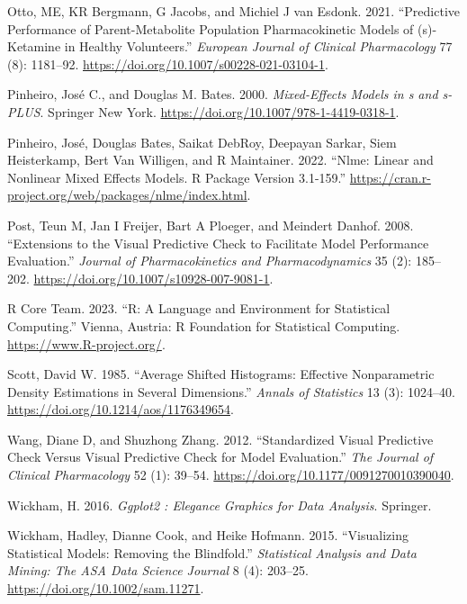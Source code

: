 \begin{CSLReferences}{1}{0}
\leavevmode{}%
Otto, ME, KR Bergmann, G Jacobs, and Michiel J van Esdonk. 2021. {``Predictive Performance of Parent-Metabolite Population Pharmacokinetic Models of (s)-Ketamine in Healthy Volunteers.''} \emph{European Journal of Clinical Pharmacology} 77 (8): 1181--92. \url{https://doi.org/10.1007/s00228-021-03104-1}.

\leavevmode{}%
Pinheiro, José C., and Douglas M. Bates. 2000. \emph{Mixed-Effects Models in s and s-{PLUS}}. Springer New York. \url{https://doi.org/10.1007/978-1-4419-0318-1}.

\leavevmode{}%
Pinheiro, José, Douglas Bates, Saikat DebRoy, Deepayan Sarkar, Siem Heisterkamp, Bert Van Willigen, and R Maintainer. 2022. {``Nlme: Linear and Nonlinear Mixed Effects Models. R Package Version 3.1-159.''} \url{https://cran.r-project.org/web/packages/nlme/index.html}.

\leavevmode{}%
Post, Teun M, Jan I Freijer, Bart A Ploeger, and Meindert Danhof. 2008. {``Extensions to the Visual Predictive Check to Facilitate Model Performance Evaluation.''} \emph{Journal of Pharmacokinetics and Pharmacodynamics} 35 (2): 185--202. \url{https://doi.org/10.1007/s10928-007-9081-1}.

\leavevmode{}%
R Core Team. 2023. {``R: A Language and Environment for Statistical Computing.''} Vienna, Austria: R Foundation for Statistical Computing. \url{https://www.R-project.org/}.

\leavevmode{}%
Scott, David W. 1985. {``Average Shifted Histograms: Effective Nonparametric Density Estimations in Several Dimensions.''} \emph{Annals of Statistics} 13 (3): 1024--40. \url{https://doi.org/10.1214/aos/1176349654}.

\leavevmode{}%
Wang, Diane D, and Shuzhong Zhang. 2012. {``Standardized Visual Predictive Check Versus Visual Predictive Check for Model Evaluation.''} \emph{The Journal of Clinical Pharmacology} 52 (1): 39--54. \url{https://doi.org/10.1177/0091270010390040}.

\leavevmode{}%
Wickham, H. 2016. \emph{Ggplot2 : Elegance Graphics for Data Analysis}. Springer.

\leavevmode{}%
Wickham, Hadley, Dianne Cook, and Heike Hofmann. 2015. {``Visualizing Statistical Models: Removing the Blindfold.''} \emph{Statistical Analysis and Data Mining: The ASA Data Science Journal} 8 (4): 203--25. \url{https://doi.org/10.1002/sam.11271}.

\end{CSLReferences}


